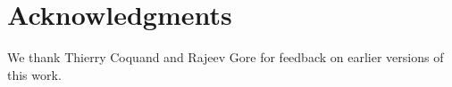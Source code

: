 \documentclass{llncs}
\begin{document}

\section*{Acknowledgments}

We thank Thierry Coquand and Rajeev Gore for feedback on earlier versions of
this work.




\end{document}
